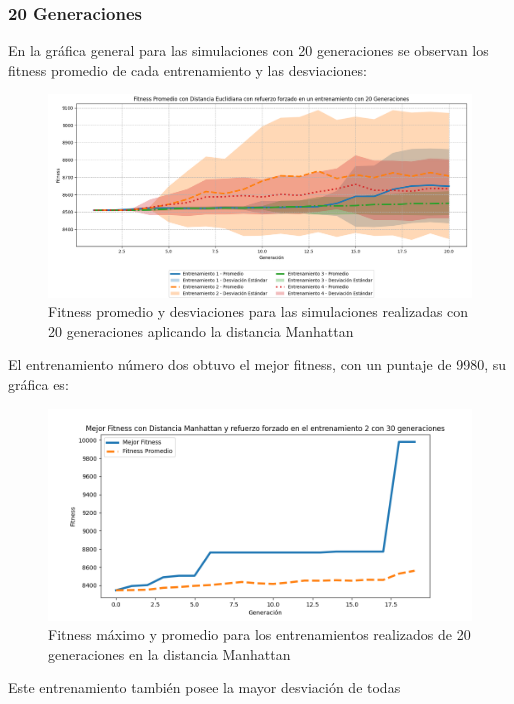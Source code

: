 \documentclass[conference]{IEEEtran}
\begin{document}
\subsubsection{20 Generaciones}
En la gráfica general para las
simulaciones con 20 generaciones se observan los fitness promedio de cada entrenamiento y las desviaciones:
\begin{figure}[H]
    \centering
    \includegraphics[width=1\linewidth]{Euclidiana/Fitness_Acumulado_Eucli_20Gen.png}
    \caption{Fitness promedio y desviaciones para las simulaciones realizadas con 20 generaciones aplicando la distancia Manhattan}
    \label{fig:manhatan_20_general}
\end{figure}
El entrenamiento número dos obtuvo el mejor fitness, con un puntaje de 9980, su gráfica es:
\begin{figure}[H]
    \centering
    \includegraphics[width=0.99\linewidth]{Manhattan/Fitness_Individual_20Gen/Fitness_2_Manh_20Gen.png}
    \caption{Fitness máximo y promedio para los entrenamientos realizados de 20 generaciones en la distancia Manhattan}
    \label{fig:manhattan20_2}
\end{figure}
Este entrenamiento también posee la mayor desviación de todas
\end{document}
